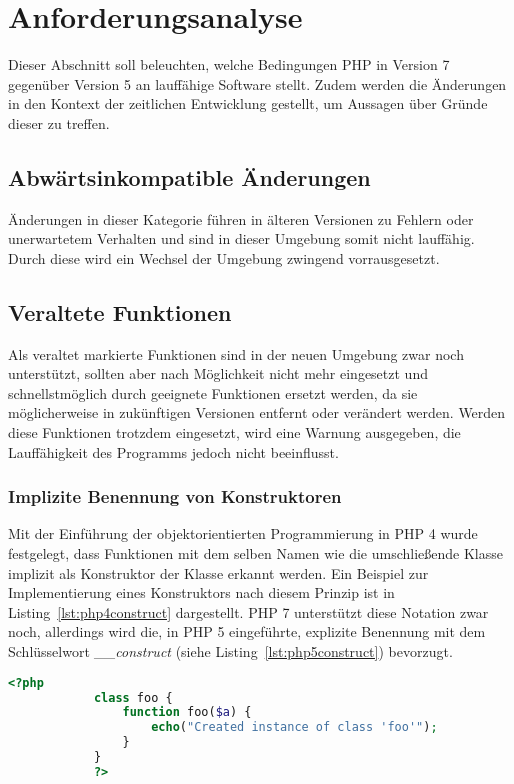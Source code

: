 \chapter{Anforderungsanalyse}\label{ch:php7}
Dieser Abschnitt soll beleuchten, welche Bedingungen PHP in Version 7 gegenüber Version 5 an lauffähige Software stellt. Zudem werden die Änderungen in den Kontext der
zeitlichen Entwicklung gestellt, um Aussagen über Gründe dieser zu treffen.

\section{Abwärtsinkompatible Änderungen}
Änderungen in dieser Kategorie führen in älteren Versionen zu Fehlern oder unerwartetem Verhalten und sind in dieser Umgebung somit nicht lauffähig. Durch diese wird ein 
Wechsel der Umgebung zwingend vorrausgesetzt.

\section{Veraltete Funktionen}
Als veraltet markierte Funktionen sind in der neuen Umgebung zwar noch unterstützt, sollten aber nach Möglichkeit nicht mehr eingesetzt und schnellstmöglich durch geeignete 
Funktionen ersetzt werden, da sie möglicherweise in zukünftigen Versionen entfernt oder verändert werden. Werden diese Funktionen trotzdem eingesetzt, wird eine Warnung 
ausgegeben, die Lauffähigkeit des Programms jedoch nicht beeinflusst.
    \subsection{Implizite Benennung von Konstruktoren}
    Mit der Einführung der objektorientierten Programmierung in PHP 4 wurde festgelegt, dass Funktionen mit dem selben Namen wie die umschließende Klasse implizit als 
    Konstruktor der Klasse erkannt werden. Ein Beispiel zur Implementierung eines Konstruktors nach diesem Prinzip ist in Listing~\ref{lst:php4construct} dargestellt.
    PHP 7 unterstützt diese Notation zwar noch, allerdings wird die, in PHP 5 eingeführte, explizite Benennung mit dem Schlüsselwort \textit{\_\_construct} (siehe 
    Listing~\ref{lst:php5construct}) bevorzugt.
        \begin{lstlisting}[language=php, caption={Beispiel eines impliziten Konstruktors}, label={lst:php4construct}]
            <?php
            class foo {
                function foo($a) {
                    echo("Created instance of class 'foo'");
                }
            }
            ?>
        \end{lstlisting}

